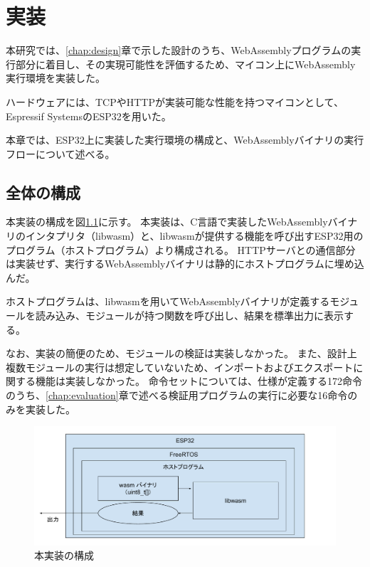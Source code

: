\chapter{実装}
\label{chap:implementation}

本研究では、\ref{chap:design}章で示した設計のうち、WebAssemblyプログラムの実行部分に着目し、その実現可能性を評価するため、マイコン上にWebAssembly実行環境を実装した。

ハードウェアには、TCPやHTTPが実装可能な性能を持つマイコンとして、Espressif SystemsのESP32\cite{esp32}を用いた。

本章では、ESP32上に実装した実行環境の構成と、WebAssemblyバイナリの実行フローについて述べる。

\section{全体の構成}

本実装の構成を図\ref{fig:esp32_libwasm}に示す。
本実装は、C言語で実装したWebAssemblyバイナリのインタプリタ（libwasm）と、libwasmが提供する機能を呼び出すESP32用のプログラム（ホストプログラム）より構成される。
HTTPサーバとの通信部分は実装せず、実行するWebAssemblyバイナリは静的にホストプログラムに埋め込んだ。

ホストプログラムは、libwasmを用いてWebAssemblyバイナリが定義するモジュールを読み込み、モジュールが持つ関数を呼び出し、結果を標準出力に表示する。

なお、実装の簡便のため、モジュールの検証は実装しなかった。
また、設計上複数モジュールの実行は想定していないため、インポートおよびエクスポートに関する機能は実装しなかった。
命令セットについては、仕様が定義する172命令のうち、\ref{chap:evaluation}章で述べる検証用プログラムの実行に必要な16命令のみを実装した。

\begin{figure}[htbp]
  \caption{本実装の構成}
  \label{fig:esp32_libwasm}
  \begin{center}
    \includegraphics[bb=0 0 720 285,width=12cm]{img/esp32_libwasm.pdf}
  \end{center}
\end{figure}

